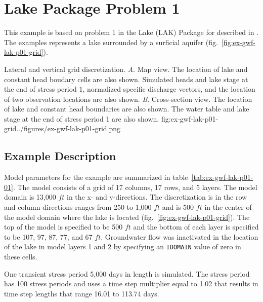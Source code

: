 \section{Lake Package Problem 1}

This example is based on problem 1 in the Lake (LAK) Package for \mftk described in \cite{modflowlak3pack}. The examples represents a lake surrounded by a surficial aquifer (fig.~\ref{fig:ex-gwf-lak-p01-grid}).                                

\begin{StandardFigure}{
                                     Lateral and vertical grid discretization. 
                                     \textit{A}. Map view. The location of lake and constant head boudary
                                     cells are also shown. Simulated heads and lake stage at the end of stress 
                                     period 1, normalized specific discharge vectors, and the location of two 
                                     observation locations are also shown.
                                     \textit{B}. Cross-section view. The location of lake and constant 
                                     head boundaries are also shown. The water table and lake stage at the
                                     end of stress period 1 are also shown. 
                                     }{fig:ex-gwf-lak-p01-grid}{../figures/ex-gwf-lak-p01-grid.png}
\end{StandardFigure}   


\subsection{Example Description}
Model parameters for the example are summarized in table~\ref{tab:ex-gwf-lak-p01-01}.  The model consists of a grid of 17 columns, 17 rows, and 5 layers. The model domain is 13,000 $ft$ in the x- and y-directions. The discretization is in the row and column directions ranges from 250 to 1,000 $ft$ and is 500 $ft$ in the center of the model domain where the lake is located (fig.~\ref{fig:ex-gwf-lak-p01-grid}). The top of the model is specified to be 500 $ft$ and the bottom of each layer is specified to be 107, 97, 87, 77, and 67 $ft$. Groundwater flow was inactivated in the location of the lake in model layers 1 and 2 by specifying an \texttt{IDOMAIN} value of zero in these cells.

One transient stress period 5,000 days in length is simulated. The stress period has 100 stress periods and uses a time step multiplier equal to 1.02 that results in time step lengths that range 16.01 to 113.74 days.

